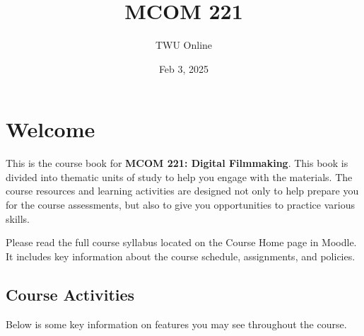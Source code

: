 \documentclass[
  letterpaper,
  DIV=11,
  numbers=noendperiod]{scrreprt}
\title{MCOM 221}
\author{TWU Online}
\date{Feb 3, 2025}
\renewcommand*\contentsname{Table of contents}
\newcommand\contentsname{Table of contents}
\begin{document}
\maketitle

\renewcommand*\contentsname{Table of contents}
{
\hypersetup{linkcolor=}
\setcounter{tocdepth}{2}
\tableofcontents
}


\chapter*{Welcome}\label{welcome}


This is the course book for \textbf{MCOM 221: Digital Filmmaking}. This
book is divided into thematic units of study to help you engage with the
materials. The course resources and learning activities are designed not
only to help prepare you for the course assessments, but also to give
you opportunities to practice various skills.

\begin{tcolorbox}[enhanced jigsaw, opacityback=0, colframe=quarto-callout-note-color-frame, leftrule=.75mm, colback=white, toprule=.15mm, breakable, arc=.35mm, rightrule=.15mm, bottomrule=.15mm, left=2mm]
\begin{minipage}[t]{5.5mm}
\textcolor{quarto-callout-note-color}{\faInfo}
\end{minipage}%
\begin{minipage}[t]{\textwidth - 5.5mm}

Please read the full course syllabus located on the Course Home page in
Moodle. It includes key information about the course schedule,
assignments, and policies.

\end{minipage}%
\end{tcolorbox}

\section*{Course Activities}\label{course-activities}


Below is some key information on features you may see throughout the
course.
\end{document}
